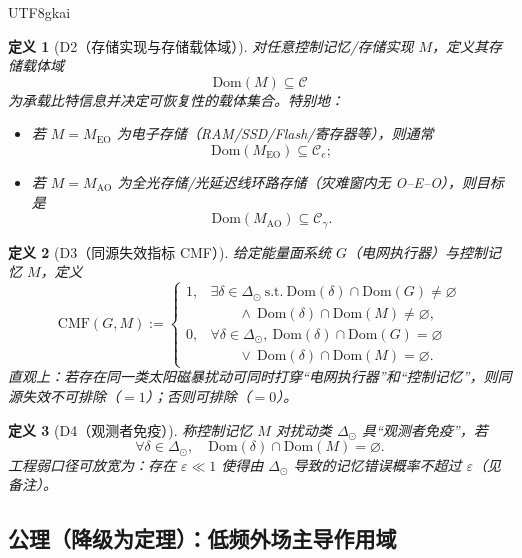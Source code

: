 \documentclass[12pt]{article}
\newtheorem{definition}{定义}[section]
\begin{document}
\begin{CJK*}{UTF8}{gkai}
\begin{definition}[D2（存储实现与存储载体域）]
\label{def:tex27-ch16b-d2}
对任意控制记忆/存储实现 $M$，定义其存储载体域
\[
  \mathrm{Dom}(M)\subseteq\mathcal{C}
\]
为承载比特信息并决定可恢复性的载体集合。特别地：
\begin{itemize}
  \item 若 $M=M_{\mathrm{EO}}$ 为电子存储（RAM/SSD/Flash/寄存器等），则通常
  \[
    \mathrm{Dom}(M_{\mathrm{EO}})\subseteq\mathcal{C}_{e};
  \]
  \item 若 $M=M_{\mathrm{AO}}$ 为全光存储/光延迟线环路存储（灾难窗内无 O--E--O），则目标是
  \[
    \mathrm{Dom}(M_{\mathrm{AO}})\subseteq\mathcal{C}_{\gamma}.
  \]
\end{itemize}
\end{definition}

\begin{definition}[D3（同源失效指标 CMF）]
\label{def:tex27-ch16b-d3}
给定能量面系统 $G$（电网执行器）与控制记忆 $M$，定义
\[
  \mathrm{CMF}(G,M)
  :=
  \begin{cases}
    1, &
    \exists \delta\in\Delta_{\odot}\ \text{s.t.}\
    \mathrm{Dom}(\delta)\cap\mathrm{Dom}(G)\neq\varnothing \\
    &\qquad\wedge\ \mathrm{Dom}(\delta)\cap\mathrm{Dom}(M)\neq\varnothing,\\
    0, &
    \forall \delta\in\Delta_{\odot},\
    \mathrm{Dom}(\delta)\cap\mathrm{Dom}(G)=\varnothing \\
    &\qquad\vee\ \mathrm{Dom}(\delta)\cap\mathrm{Dom}(M)=\varnothing.
  \end{cases}
\]
直观上：若存在同一类太阳磁暴扰动可同时打穿“电网执行器”和“控制记忆”，则同源失效不可排除（$=1$）；否则可排除（$=0$）。
\end{definition}

\begin{definition}[D4（观测者免疫）]
\label{def:tex27-ch16b-d4}
称控制记忆 $M$ 对扰动类 $\Delta_{\odot}$ 具“观测者免疫”，若
\[
  \forall \delta\in\Delta_{\odot},\quad
  \mathrm{Dom}(\delta)\cap\mathrm{Dom}(M)=\varnothing.
\]
工程弱口径可放宽为：存在 $\varepsilon\ll 1$ 使得由 $\Delta_{\odot}$ 导致的记忆错误概率不超过 $\varepsilon$（见备注）。
\end{definition}

\subsection{公理（降级为定理）：低频外场主导作用域}
\label{subsec:tex27-ch16b-axiom}


\end{CJK*}
\end{document}
